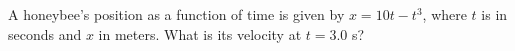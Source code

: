 A honeybee's position as a function of time is given by
$x=10t-t^3$, where $t$ is in seconds and $x$ in meters.  What
is its velocity at $t=3.0$ s?
\answercheck
